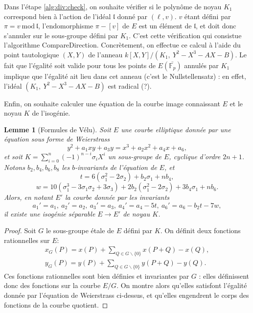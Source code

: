\documentclass[11pt,a4paper]{article}
\newcommand{\F}{\mathbb{F}}
\newcommand{\vers}{\longrightarrow}
\renewcommand{\frak}{\mathfrak}
\renewcommand{\mod}{\ \mathrm{mod}\ }
\newtheorem*{lem}{Lemme}
\theoremstyle{definition}
\begin{document}
Dans l'étape \ref{alg:div:check}, on souhaite vérifier si le polynôme de noyau $K_1$ correspond bien à l'action de l'idéal $\frak l$ donné par $(\ell,v)$. $v$ étant défini par $\pi = v \mod \frak l$, l'endomorphisme $\pi - [v]$ de $E$ est un élément de $\frak l$, et doit donc s'annuler sur le sous-groupe défini par $K_1$. C'est cette vérification qui consistue l'algorithme {\sc CompareDirection}. Concrètement, on effectue ce calcul à l'aide du point tautologique $(X, Y)$ de l'anneau $k[X, Y]/(K_1,\ Y^2 - X^3 - AX - B).$ Le fait que l'égalité soit valide pour tous les points de $E(\bar{\F_p})$ annulés par $K_1$ implique que l'égalité ait lieu dans cet anneau (c'est le Nullstellensatz) : en effet, l'idéal $(K_1,\ Y^2 - X^3 - AX - B)$  est radical (?).


Enfin, on souhaite calculer une équation de la courbe image connaissant $E$ et le noyau $K$ de l'isogénie.

\begin{lem}[Formules de Vélu]
Soit $E$ une courbe elliptique donnée par une équation sous forme de Weierstrass
$$y^2 + a_1 x y + a_3 y = x^3 + a_2 x^2 + a_4 x + a_6,$$
et soit $K = \sum_{i=0}^n (-1)^{n-i} \sigma_i X^i$ un sous-groupe de $E$, cyclique d'ordre $2n+1$. Notons $b_2, b_4, b_6, b_8$ les $b$-invariants de l'équation de $E$, et 
$$ t = 6(\sigma_1^2 - 2 \sigma_2) + b_2 \sigma_1 + n b_4,$$
$$ w = 10 (\sigma_1^3 - 3 \sigma_1 \sigma_2 + 3 \sigma_3) + 2  b_2 (\sigma_1^2 - 2 \sigma_2) + 3 b_4 \sigma_1 + n b_6.$$
Alors, en notant $E'$ la courbe donnée par les invariants
$$ a_1' = a_1,\ a_2' = a_2,\ a_3' = a_3,\ a_4' = a_4 - 5 t,\ a_6' = a_6 - b_2 t - 7 w,$$
il existe une isogénie séparable $E\vers E'$ de noyau $K$.
\end{lem}

\begin{proof}
Soit $G$ le sous-groupe étale de $E$ défini par $K$. On définit deux fonctions rationnelles sur $E$:
$$\begin{aligned}
x_G(P) = x(P) + \sum_{Q\in G\backslash \{0\}} x(P+Q) - x(Q),\\
y_G(P) = y(P) + \sum_{Q\in G\backslash \{0\}} y(P+Q) - y(Q).
\end{aligned}$$
Ces fonctions rationnelles sont bien définies et invariantes par $G$ : elles définissent donc des fonctions sur la courbe $E/G$. On montre alors qu'elles satisfont l'égalité donnée par l'équation de Weierstrass ci-dessus, et qu'elles engendrent le corps des fonctions de la courbe quotient.
\end{proof}
\end{document}
